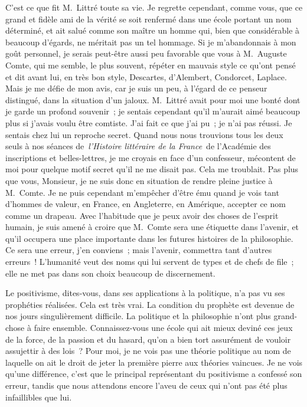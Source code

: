 \documentclass[french,twoside]{book} %
\newcommand\orgName[1]{#1}
\newcommand\persName[1]{#1}
\newcommand\placeName[1]{#1}
\begin{document}
C’est ce que fit {\persName M. Littré} toute sa vie. Je regrette cependant, comme vous, que ce grand et fidèle ami de la vérité se soit renfermé dans une école portant un nom déterminé, et ait salué comme son maître un homme qui, bien que considérable à beaucoup d’égards, ne méritait pas un tel hommage. Si je m’abandonnais à mon goût personnel, je serais peut-être aussi peu favorable que vous à {\persName M. Auguste Comte}, qui me semble, le plus souvent, répéter en mauvais style ce qu’ont pensé et dit avant lui, en très bon style, {\persName Descartes}, {\persName d’Alembert}, {\persName Condorcet}, {\persName Laplace}. Mais je me défie de mon avis, car je suis un peu, à l’égard de ce penseur distingué, dans la situation d’un jaloux. {\persName M. Littré} avait pour moi une bonté dont je garde un profond souvenir ; je sentais cependant qu’il m’aurait aimé beaucoup plus si j’avais voulu être comtiste. J’ai fait ce que j’ai pu ; je n’ai pas réussi. Je sentais chez lui un reproche secret. Quand nous nous trouvions tous les deux seuls à nos séances de \emph{l’Histoire littéraire de la France} de l’{\orgName Académie des inscriptions et belles-lettres}, je me croyais en face d’un confesseur, mécontent de moi pour quelque motif secret qu’il ne me disait pas. Cela me troublait. Pas plus que vous, Monsieur, je ne suis donc en situation de rendre pleine justice à {\persName M. Comte}. Je ne puis cependant m’empêcher d’être ému quand je vois tant d’hommes de valeur, en {\placeName France}, en {\placeName Angleterre}, en {\placeName Amérique}, accepter ce nom comme un drapeau. Avec l’habitude que je peux avoir des choses de l’esprit humain, je suis amené à croire que {\persName M. Comte} sera une étiquette dans l’avenir, et qu’il occupera une place importante dans les futures histoires de la philosophie. Ce sera une erreur, j’en conviens ; mais l’avenir, commettra tant d’autres erreurs ! L’humanité veut des noms qui lui servent de types et de chefs de file ; elle ne met pas dans son choix beaucoup de discernement.\par
Le positivisme, dites-vous, dans ses applications à la politique, n’a pas vu ses prophéties réalisées. Cela est très vrai. La condition du prophète est devenue de nos jours singulièrement difficile. La politique et la philosophie n’ont plus grand-chose à faire ensemble. Connaissez-vous une école qui ait mieux deviné ces jeux de la force, de la passion et du hasard, qu’on a bien tort assurément de vouloir assujettir à des lois ? Pour moi, je ne vois pas une théorie politique au nom de laquelle on ait le droit de jeter la première pierre aux théories vaincues. Je ne vois qu’une différence, c’est que le principal représentant du positivisme a confessé son erreur, tandis que nous attendons encore l’aveu de ceux qui n’ont pas été plus infaillibles que lui.\par
\end{document}
